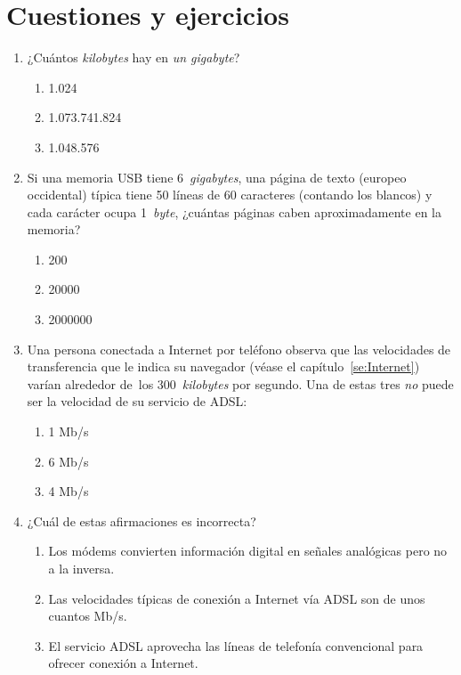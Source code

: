 \section{Cuestiones y ejercicios} \begin{enumerate} \item ¿Cuántos \emph{kilobytes} hay en \emph{un gigabyte}? \begin{enumerate} \item 1.024 \item 1.073.741.824 \item 1.048.576 \end{enumerate} 

\item Si una memoria USB tiene 6~\emph{gigabytes}, una página de texto (europeo occidental) típica tiene 50 líneas de 60 caracteres (contando los blancos) y cada carácter ocupa 1~\emph{byte}, ¿cuántas páginas caben aproximadamente en la memoria? \begin{enumerate} \item 200 \item 20000 \item 2000000 \end{enumerate} 

\item Una persona conectada a Internet por teléfono observa que las velocidades de transferencia que le indica su navegador (véase el capítulo~\ref{se:Internet}) varían alrededor de~los 300~\emph{kilobytes} por segundo. Una de estas tres \emph{no} puede ser la velocidad de su servicio de ADSL: \begin{enumerate} \item 1 Mb/s \item 6 Mb/s \item 4 Mb/s \end{enumerate} 

\item ¿Cuál de estas afirmaciones es incorrecta? \begin{enumerate} \item Los módems convierten información digital en señales analógicas pero no a la inversa. \item Las velocidades típicas de conexión a Internet vía ADSL son de unos cuantos Mb/s. \item El servicio ADSL aprovecha las líneas de telefonía convencional para ofrecer conexión a Internet. \end{enumerate} 


\end{enumerate}
